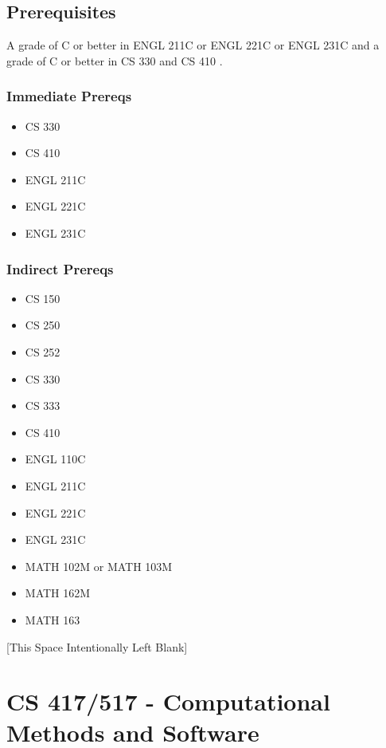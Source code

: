 \documentclass[]{article}
\providecommand{\tightlist}{%
  \setlength{\itemsep}{0pt}\setlength{\parskip}{0pt}}
\newcommand{\pagebreakhere}{
\vspace*{\fill}
\begin{center}
[This Space Intentionally Left Blank]
\end{center}
\vspace*{\fill}
\newpage
}
\begin{document}
\subsection{Prerequisites}\label{prerequisites-27}

A grade of C or better in ENGL 211C or ENGL 221C or ENGL 231C and a
grade of C or better in CS 330 and CS 410 .

\subsubsection{Immediate Prereqs}\label{immediate-prereqs-19}

\begin{itemize}
\tightlist
\item
  CS 330
\item
  CS 410
\item
  ENGL 211C
\item
  ENGL 221C
\item
  ENGL 231C
\end{itemize}

\subsubsection{Indirect Prereqs}\label{indirect-prereqs-19}

\begin{itemize}
\tightlist
\item
  CS 150
\item
  CS 250
\item
  CS 252
\item
  CS 330
\item
  CS 333
\item
  CS 410
\item
  ENGL 110C
\item
  ENGL 211C
\item
  ENGL 221C
\item
  ENGL 231C
\item
  MATH 102M or MATH 103M
\item
  MATH 162M
\item
  MATH 163
\end{itemize}

\pagebreakhere
\section{CS 417/517 - Computational Methods and
Software}\label{cs-417517---computational-methods-and-software}
\end{document}
